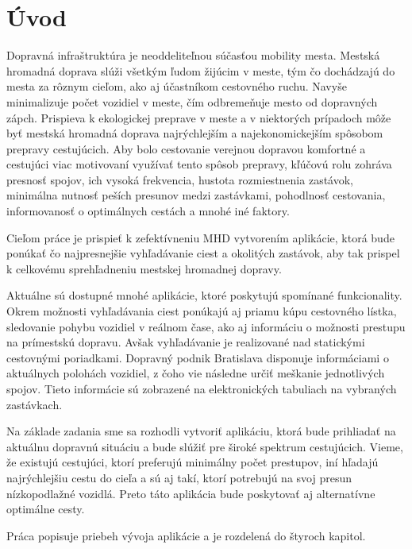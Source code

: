 \chapter*{Úvod} %

Dopravná infraštruktúra je neoddeliteľnou súčasťou mobility mesta. Mestská hromadná doprava slúži všetkým ľudom žijúcim v meste, tým čo dochádzajú do mesta za rôznym cieľom, ako aj účastníkom cestovného ruchu. Navyše minimalizuje počet vozidiel v meste, čím odbremeňuje mesto od dopravných zápch. Prispieva k ekologickej preprave v meste a v niektorých prípadoch môže byť mestská hromadná doprava najrýchlejším a najekonomickejším spôsobom prepravy cestujúcich. Aby bolo cestovanie verejnou dopravou komfortné a cestujúci viac motivovaní využívať tento spôsob prepravy, kľúčovú rolu zohráva presnosť spojov, ich vysoká frekvencia, hustota rozmiestnenia zastávok, minimálna nutnosť peších presunov medzi zastávkami, pohodlnosť cestovania, informovanosť o optimálnych cestách a mnohé iné faktory.

Cieľom práce je prispieť k zefektívneniu MHD vytvorením aplikácie,
ktorá bude ponúkať čo najpresnejšie vyhľadávanie ciest a okolitých zastávok, aby tak prispel k celkovému sprehľadneniu mestskej hromadnej dopravy.

Aktuálne sú dostupné mnohé aplikácie, ktoré poskytujú spomínané funkcionality. Okrem možnosti vyhľadávania ciest ponúkajú aj priamu kúpu cestovného lístka, sledovanie pohybu vozidiel v reálnom čase, ako aj informáciu o možnosti prestupu na prímestskú dopravu. Avšak vyhľadávanie je realizované nad statickými cestovnými poriadkami. Dopravný podnik Bratislava disponuje informáciami o aktuálnych polohách vozidiel, z čoho vie následne určiť meškanie jednotlivých spojov. Tieto informácie sú zobrazené na elektronických tabuliach na vybraných zastávkach.

Na základe zadania sme sa rozhodli vytvoriť aplikáciu, ktorá bude prihliadať na aktuálnu dopravnú situáciu a bude slúžiť pre široké spektrum cestujúcich. Vieme, že existujú cestujúci, ktorí preferujú minimálny počet prestupov, iní hľadajú najrýchlejšiu cestu do cieľa a sú aj takí, ktorí potrebujú na svoj presun nízkopodlažné vozidlá. Preto táto aplikácia bude poskytovať aj alternatívne optimálne cesty.

Práca popisuje priebeh vývoja aplikácie a je rozdelená do štyroch kapitol. 

